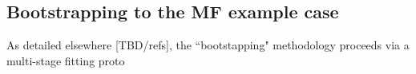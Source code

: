 \subsection{Bootstrapping to the MF example case}

As detailed elsewhere [TBD/refs], the ``bootstapping" methodology proceeds via a multi-stage fitting proto